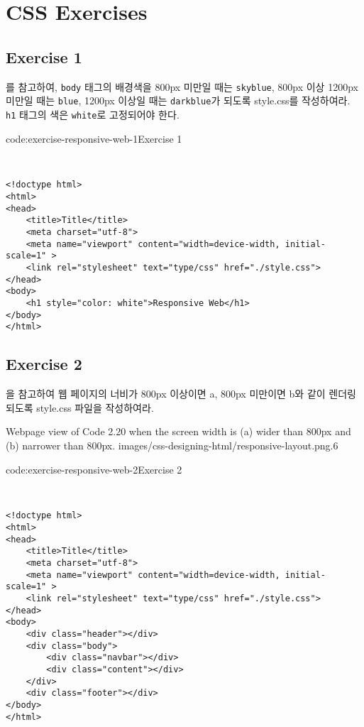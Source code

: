 \section{CSS Exercises} \label{sect:css-exercises}

\subsection*{Exercise 1}
를 참고하여, \texttt{body} 태그의 배경색을 800px 미만일 때는 \texttt{skyblue}, 800px 이상 1200px 미만일 때는 \texttt{blue}, 1200px 이상일 때는 \texttt{darkblue}가 되도록 style.css를 작성하여라. \texttt{h1} 태그의 색은 \texttt{white}로 고정되어야 한다.

\begin{codeenv}{code:exercise-responsive-web-1}{Exercise 1}\begin{verbatim}


<!doctype html>
<html>
<head>
    <title>Title</title>
    <meta charset="utf-8">
    <meta name="viewport" content="width=device-width, initial-scale=1" >
    <link rel="stylesheet" text="type/css" href="./style.css">
</head>
<body>
    <h1 style="color: white">Responsive Web</h1>
</body>
</html>
\end{verbatim}
\end{codeenv}

\subsection*{Exercise 2}
을 참고하여 웹 페이지의 너비가 800px 이상이면 a, 800px 미만이면 b와 같이 렌더링 되도록 style.css 파일을 작성하여라.

    {Webpage view of Code 2.20 when the screen width is (a) wider than 800px and (b) narrower than 800px.}
    {images/css-designing-html/responsive-layout.png}{.6}

\begin{codeenv}{code:exercise-responsive-web-2}{Exercise 2}\begin{verbatim}


<!doctype html>
<html>
<head>
    <title>Title</title>
    <meta charset="utf-8">
    <meta name="viewport" content="width=device-width, initial-scale=1" >
    <link rel="stylesheet" text="type/css" href="./style.css">
</head>
<body>
    <div class="header"></div>
    <div class="body">
        <div class="navbar"></div>
        <div class="content"></div>
    </div>
    <div class="footer"></div>
</body>
</html>
\end{verbatim}
\end{codeenv}
